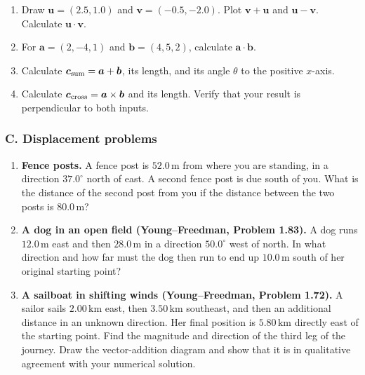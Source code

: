 \documentclass[11pt,letterpaper]{article}
\newcommand{\vect}[1]{\boldsymbol{#1}}
\newcommand{\unit}[1]{\,\mathrm{#1}}
\newcommand{\degree}{^{\circ}}
\begin{document}
\begin{enumerate}[label=\textbf{(\alph*)}]
\item Draw $\vect u=(2.5,1.0)$ and $\vect v=(-0.5,-2.0)$. Plot $\vect v+\vect u$ and $\vect u-\vect v$. Calculate $\vect u\cdot\vect v$.
\item For $\vect a=(2,-4,1)$ and $\vect b=(4,5,2)$, calculate $\vect a\cdot\vect b$.
\item Calculate $\vect c_{\rm sum}=\vect a+\vect b$, its length, and its angle $\theta$ to the positive $x$-axis.
\item Calculate $\vect c_{\rm cross}=\vect a\times\vect b$ and its length. Verify that your result is perpendicular to both inputs.
\end{enumerate}

\subsubsection*{C. Displacement problems}
\begin{enumerate}[label=\textbf{\arabic*.},start=9,itemsep=1.1em]
\item \textbf{Fence posts.} A fence post is $52.0\unit{m}$ from where you are standing, in a direction $37.0\degree$ north of east. A second fence post is due south of you. What is the distance of the second post from you if the distance between the two posts is $80.0\unit{m}$?

\item \textbf{A dog in an open field (Young--Freedman, Problem 1.83).} A dog runs $12.0\unit{m}$ east and then $28.0\unit{m}$ in a direction $50.0\degree$ west of north. In what direction and how far must the dog then run to end up $10.0\unit{m}$ south of her original starting point?

\item \textbf{A sailboat in shifting winds (Young--Freedman, Problem 1.72).} A sailor sails $2.00\unit{km}$ east, then $3.50\unit{km}$ southeast, and then an additional distance in an unknown direction. Her final position is $5.80\unit{km}$ directly east of the starting point. Find the magnitude and direction of the third leg of the journey. Draw the vector-addition diagram and show that it is in qualitative agreement with your numerical solution.
\end{enumerate}
\end{document}
